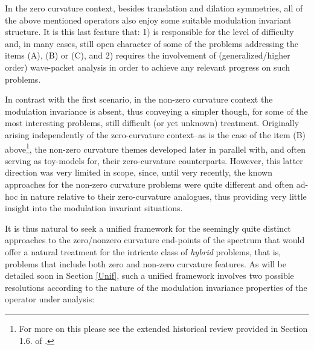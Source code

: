 \documentclass[a4paper,reqno]{amsart}
\numberwithin{equation}{section}
\theoremstyle{definition}
\begin{document}
In the zero curvature context, besides translation and dilation symmetries, all of the above mentioned operators also enjoy some suitable modulation invariant structure. It is this last feature that: 1) is responsible for the level of difficulty and, in many cases, still open character of some of the problems addressing the items (A), (B) or (C), and 2) requires the involvement of (generalized/higher order) wave-packet analysis in order to achieve any relevant progress on such problems.

In contrast with the first scenario, in the non-zero curvature context the modulation invariance is absent, thus conveying a simpler though, for some of the most interesting problems, still difficult (or yet unknown) treatment. Originally arising independently of the zero-curvature context--as is the case of the item (B) above\footnote{For more on this please see the extended historical review provided in Section 1.6. of \cite{Lie19}.}, the non-zero curvature themes developed later in parallel with, and often serving as toy-models for, their zero-curvature counterparts. However, this latter direction was very limited in scope, since, until very recently, the known approaches for the non-zero curvature problems were quite different and often ad-hoc in nature relative to their zero-curvature analogues, thus providing very little insight into the modulation invariant situations.

It is thus natural to seek a unified framework for the seemingly quite distinct approaches to the zero/nonzero curvature end-points of the spectrum that would offer a natural treatment for the intricate class of \emph{hybrid} problems, that is, problems that include both zero and non-zero curvature features.
As will be detailed soon in Section \ref{Unif}, such a unified framework involves two possible resolutions according to the nature of the modulation invariance properties of the operator under analysis:
\end{document}
